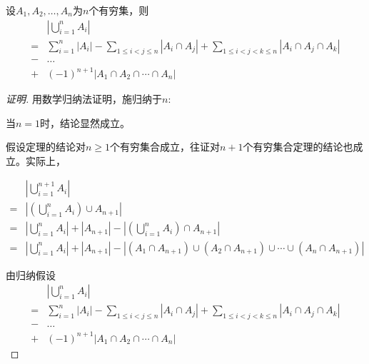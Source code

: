 \begin{Thm}
  设$A_1, A_2, \ldots, A_n$为$n$个有穷集，则
  \begin{equation*}
\begin{split}
    &|\bigcup_{i=1}^nA_i|\\
=&\sum_{i=1}^n|A_i| - \sum_{1\leq i < j \leq n}|A_i \cap A_j| + \sum_{1 \leq  i < j < k \leq n}|A_i \cap A_j \cap A_k|\\
-&\ldots\\
+&(-1)^{n+1}|A_1 \cap A_2 \cap \cdots \cap A_n| 
  \end{split}
\end{equation*}
\end{Thm}
\begin{proof}[证明]
用数学归纳法证明，施归纳于$n$:

当$n=1$时，结论显然成立。

假设定理的结论对$n \geq 1$个有穷集合成立，往证对$n+1$个有穷集合定理的结论也成立。实际上，

  \begin{equation}\label{eq1}
    \begin{split}
      &|\bigcup_{i=1}^{n+1}A_i|\\
      =&|(\bigcup_{i=1}^nA_i) \cup A_{n+1}|\\
      =&|\bigcup_{i=1}^nA_i| + |A_{n+1}| - |(\bigcup_{i=1}^nA_i) \cap A_{n+1}|\\
      =&|\bigcup_{i=1}^nA_i| + |A_{n+1}| - |(A_1 \cap A_{n+1}) \cup (A_2 \cap A_{n+1}) \cup \cdots \cup (A_n \cap A_{n+1})|
    \end{split}
  \end{equation}

    由归纳假设
  \begin{equation}\label{eq2}
\begin{split}
    &|\bigcup_{i=1}^nA_i|\\
=&\sum_{i=1}^n|A_i| - \sum_{1\leq i < j \leq n}|A_i \cap A_j| + \sum_{1 \leq  i < j < k \leq n}|A_i \cap A_j \cap A_k|\\
-&\ldots\\
+&(-1)^{n+1}|A_1 \cap A_2 \cap \cdots \cap A_n| 
  \end{split}
\end{equation}


\end{proof}
